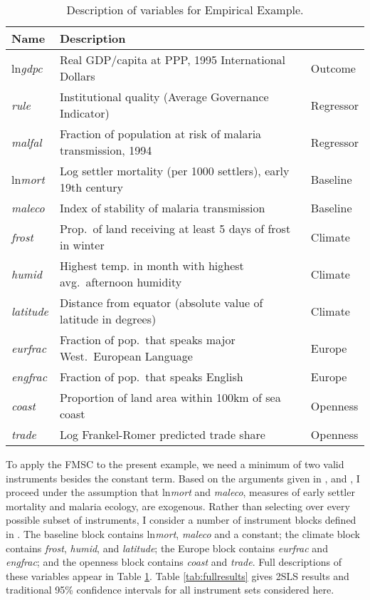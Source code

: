 \begin{table}[!tbp]
\small
\centering
\begin{tabular}{lll}
\hline \hline
Name& Description &\\
\hline
ln\emph{gdpc}&Real GDP/capita at PPP, 1995 International Dollars &Outcome\\
\emph{rule}&Institutional quality (Average Governance Indicator)&Regressor\\
\emph{malfal}&Fraction of population at risk of malaria transmission, 1994&Regressor\\
ln\emph{mort}&Log settler mortality (per 1000 settlers), early 19th century&Baseline\\
\emph{maleco}&Index of stability of malaria transmission&Baseline\\
\emph{frost}&Prop.\ of land receiving at least 5 days of frost in winter&Climate\\
\emph{humid}&Highest temp. in month with highest avg.\ afternoon humidity&Climate\\
\emph{latitude}&Distance from equator (absolute value of latitude in degrees)&Climate \\
\emph{eurfrac}&Fraction of pop.\ that speaks major West.\ European Language&Europe \\
\emph{engfrac}&Fraction of pop.\ that speaks English&Europe\\
\emph{coast}&Proportion of land area within 100km of sea coast&Openness\\
\emph{trade}&Log Frankel-Romer predicted trade share&Openness\\
\hline
\end{tabular}
\caption{Description of variables for Empirical Example.}
\label{tab:desc}
\end{table}

To apply the FMSC to the present example, we need a minimum of two valid instruments besides the constant term. 
Based on the arguments given in \cite{Acemoglu}, \cite{Carstensen2006} and \cite{Sachs}, I proceed under the assumption that ln\emph{mort} and \emph{maleco}, measures of early settler mortality and malaria ecology, are exogenous.
Rather than selecting over every possible subset of instruments, I consider a number of instrument blocks defined in \cite{Carstensen2006}.
The baseline block contains ln\emph{mort}, \emph{maleco} and a constant; the climate block contains \emph{frost}, \emph{humid}, and \emph{latitude}; the Europe block contains \emph{eurfrac} and \emph{engfrac}; and the openness block contains \emph{coast} and \emph{trade}. 
Full descriptions of these variables appear in Table \ref{tab:desc}.
Table \ref{tab:fullresults} gives 2SLS results and traditional 95\% confidence intervals for all instrument sets considered here.

